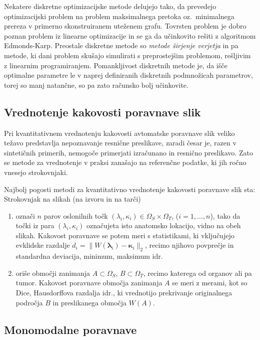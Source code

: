 \documentclass[journal]{IEEEtran}
\begin{document}
Nekatere diskretne optimizacijske metode delujejo tako, da prevedejo optimizacijski problem na problem maksimalnega pretoka oz.~minimalnega prereza v primerno skonstruiranem uteženem grafu. Tovrsten problem je dobro poznan problem iz linearne optimizacije in se ga da učinkovito rešiti z algoritmom Edmonds-Karp. Preostale diskretne metode so \emph{metode širjenje verjetja} in pa metode, ki dani problem skušajo simulirati s preprostejšim problemom, rešljivim z linearnim programiranjem. Pomankljivost diskretnih metode je, da išče optimalne parametre le v naprej definiranih diskretnih podmnožicah parametrov, torej so manj natančne, so pa zato računsko bolj učinkovite.


\subsection{Vrednotenje kakovosti poravnave slik}

Pri kvantitativnem vrednotenju kakovosti avtomatske poravnave slik veliko težavo predstavlja nepoznavanje resnične preslikave, zaradi česar je, razen v sintetičnih primerih, nemogoče primerjati izračunano in resnično preslikavo. Zato se metode za vrednotenje v praksi zanašajo na referenčne podatke, ki jih ročno vnesejo strokovnjaki.

Najbolj pogosti metodi za kvantitativno vrednotenje kakovosti poravnave slik sta: Strokovnjak na slikah (na izvoru in na tarči)
\begin{enumerate}
\item označi $n$ parov oslonilnih točk $(\lambda_i,\kappa_i)\in\Omega_S\times\Omega_T$, ($i=1,\dots,n$), tako da točki iz para $(\lambda_i, \kappa_i)$ označujeta isto anatomsko lokacijo, vidno na obeh slikah. Kakovost poravnave se potem meri s statistikami, ki vključujejo evklidske razdalje $d_i=\|W(\boldsymbol{\lambda}_i)-\boldsymbol{\kappa}_i\|_2$, recimo njihovo povprečje in standardna deviacija, minimum, maksimum idr.
\item oriše območji zanimanja $A\subset\Omega_S$, $B\subset\Omega_T$, recimo katerega od organov ali pa tumor. Kakovost poravnave območja zanimanja $A$ se meri z merami, kot so Dice, Hausdorffova razdalja idr., ki vrednotijo prekrivanje originalnega področja $B$ in preslikanega območja $W(A)$.
\end{enumerate}

\subsection{Monomodalne poravnave}
\end{document}
